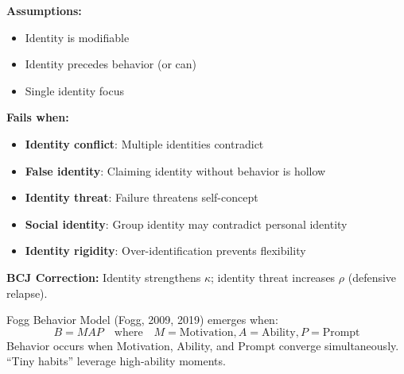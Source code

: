 \begin{tcolorbox}[colback=red!5!white, colframe=red!75!black, title=Boundary Condition: Where Identity-Based Habits Fail]
\textbf{Assumptions:}
\begin{itemize}[nosep]
\item Identity is modifiable
\item Identity precedes behavior (or can)
\item Single identity focus
\end{itemize}

\textbf{Fails when:}
\begin{itemize}[nosep]
\item \textbf{Identity conflict}: Multiple identities contradict
\item \textbf{False identity}: Claiming identity without behavior is hollow
\item \textbf{Identity threat}: Failure threatens self-concept
\item \textbf{Social identity}: Group identity may contradict personal identity
\item \textbf{Identity rigidity}: Over-identification prevents flexibility
\end{itemize}

\textbf{BCJ Correction:} Identity strengthens $\kappa$; identity threat increases $\rho$ (defensive relapse).
\end{tcolorbox}


\begin{theorem}
\label{thm:fogg}
Fogg Behavior Model (Fogg, 2009, 2019) emerges when:
\begin{equation}
\boxed{B = MAP \quad \text{where} \quad M = \text{Motivation}, A = \text{Ability}, P = \text{Prompt}}
\end{equation}
Behavior occurs when Motivation, Ability, and Prompt converge simultaneously. ``Tiny habits'' leverage high-ability moments.
\end{theorem}

